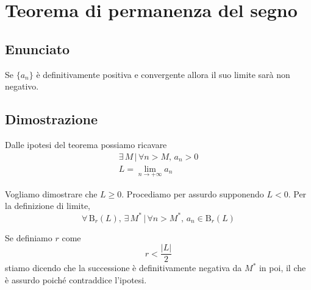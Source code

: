 \documentclass[../../dimostrazioni]{subfiles}
\begin{document}
    \chapter{Teorema di permanenza del segno}

        \section*{Enunciato}

            Se \(\{a_n\}\) è definitivamente positiva e convergente allora il suo limite sarà non negativo.

        \section*{Dimostrazione}

            Dalle ipotesi del teorema possiamo ricavare
            \begin{gather*}
                \exists \, M \, | \, \forall n > M, \, a_n > 0\\
                L = \lim_{n \to +\infty} a_n
            \end{gather*}

            Vogliamo dimostrare che \(L \geqslant 0\). Procediamo per assurdo supponendo \(L < 0\). Per la definizione
            di limite,
            \[
                \forall \, \mathrm{B}_r (L), \, \exists \, M^* \, | \, \forall n > M^*, \, a_n \in \mathrm{B}_r (L)
            \]

            Se definiamo \(r\) come
            \[
                r < \frac{|L|}{2}
            \]
            stiamo dicendo che la successione è definitivamente negativa da \(M^*\) in poi, il che è assurdo poiché
            contraddice l'ipotesi.
    
\end{document}
